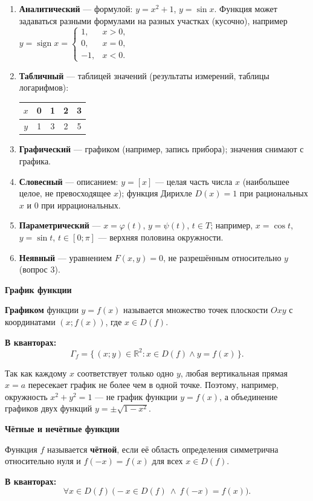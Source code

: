 \documentclass[a4paper,11pt]{article}
\newcommand{\R}{\mathbb{R}}
\newcommand{\kv}{\par\noindent\textbf{\textcolor{oprc!85!black}{В кванторах:}}}
\newcommand{\podr}[1]{\par\needspace{8\baselineskip}\medskip
  {\large\bfseries\textcolor{oprc!80!black}{#1}}\par\nopagebreak\smallskip}
\begin{document}
\begin{enumerate}[leftmargin=*]
  \item \textbf{Аналитический} --- формулой: $y = x^2 + 1$, $y = \sin x$. Функция может задаваться разными формулами на разных
        участках (кусочно), например
        $y = \operatorname{sign} x = \begin{cases} 1, & x > 0,\\ 0, & x = 0,\\ -1, & x < 0. \end{cases}$
  \item \textbf{Табличный} --- таблицей значений (результаты измерений, таблицы логарифмов):
        \begin{tabular}{c|cccc} $x$ & 0 & 1 & 2 & 3 \\ \hline $y$ & 1 & 3 & 2 & 5 \end{tabular}
  \item \textbf{Графический} --- графиком (например, запись прибора); значения снимают с графика.
  \item \textbf{Словесный} --- описанием: $y = [x]$ --- целая часть числа $x$ (наибольшее целое, не превосходящее $x$);
        функция Дирихле $D(x) = 1$ при рациональных $x$ и $0$ при иррациональных.
  \item \textbf{Параметрический} --- $x = \varphi(t)$, $y = \psi(t)$, $t \in T$; например, $x = \cos t$, $y = \sin t$, $t \in [0; \pi]$ ---
        верхняя половина окружности.
  \item \textbf{Неявный} --- уравнением $F(x, y) = 0$, не разрешённым относительно $y$ (вопрос 3).
\end{enumerate}

\podr{График функции}

\begin{opr}
\textbf{Графиком} функции $y = f(x)$ называется множество точек плоскости $Oxy$ с координатами $(x; f(x))$, где $x \in D(f)$.
\kv
\[
  \Gamma_f = \{\, (x; y) \in \R^2 : x \in D(f) \wedge y = f(x) \,\}.
\]
\end{opr}

Так как каждому $x$ соответствует только одно $y$, любая вертикальная прямая $x = a$ пересекает график не более чем в одной точке.
Поэтому, например, окружность $x^2 + y^2 = 1$ --- не график функции $y = f(x)$, а объединение графиков двух функций $y = \pm\sqrt{1 - x^2}$.

\podr{Чётные и нечётные функции}

\begin{opr}
Функция $f$ называется \textbf{чётной}, если её область определения симметрична относительно нуля и $f(-x) = f(x)$ для всех $x \in D(f)$.
\kv
\[
  \forall x \in D(f)\ \bigl( -x \in D(f) \ \wedge\ f(-x) = f(x) \bigr).
\]
\end{opr}
\end{document}
